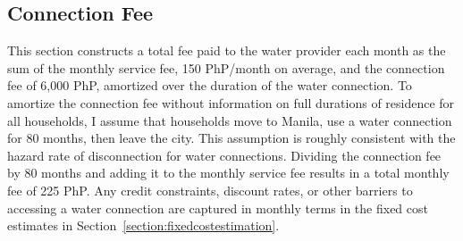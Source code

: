 \documentclass[12pt]{article}
\begin{document}
\pagebreak




\begin{appendices}









\section{Connection Fee}\label{appendix:connectionfeeamortization}

This section constructs a total fee paid to the water provider each month as the sum of the monthly service fee, 150 PhP/month on average, and the connection fee of 6,000 PhP, amortized over the duration of the water connection.  To amortize the connection fee without information on full durations of residence for all households, I assume that households move to Manila, use a water connection for 80 months, then leave the city.  This assumption is roughly consistent with the hazard rate of disconnection for water connections.  Dividing the connection fee by 80 months and adding it to the monthly service fee results in a total monthly fee of 225 PhP.  Any credit constraints, discount rates, or other barriers to accessing a water connection are captured in monthly terms in the fixed cost estimates in Section~\ref{section:fixedcostestimation}.



\end{appendices}
\end{document}
